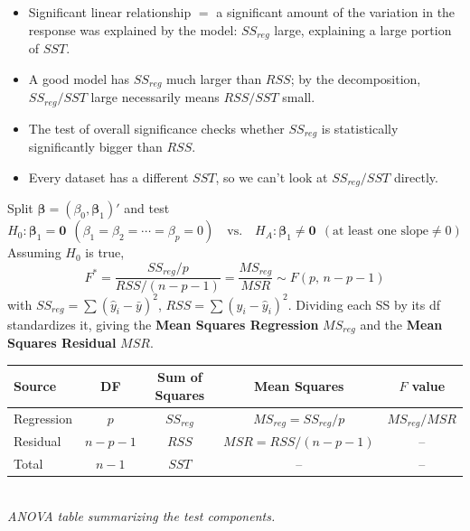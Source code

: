\begin{remark}
    \begin{itemize}
        \item Significant linear relationship $=$ a significant amount of the variation in the
        response was explained by the model: $SS_{reg}$ large, explaining a large portion of $SST$.
        \item A good model has $SS_{reg}$ much larger than $RSS$; by the decomposition,
        $SS_{reg}/SST$ large necessarily means $RSS/SST$ small.
        \item The test of overall significance checks whether $SS_{reg}$ is statistically
        significantly bigger than $RSS$.
        \item Every dataset has a different $SST$, so we can't look at $SS_{reg}/SST$ directly.
    \end{itemize}
\end{remark}

\begin{definition}
    Split $\boldsymbol\beta=(\beta_0,\boldsymbol\beta_1)'$ and test
    \[H_0:\boldsymbol\beta_1=\mathbf{0}\ \ (\beta_1=\beta_2=\cdots=\beta_p=0)\quad\text{vs.}\quad H_A:\boldsymbol\beta_1\neq\mathbf{0}\ \ (\text{at least one slope}\neq0)\]
    Assuming $H_0$ is true,
    \[\boxed{F^*=\frac{SS_{reg}/p}{RSS/(n-p-1)}=\frac{MS_{reg}}{MSR}\sim F(p,\,n-p-1)}\]
    with $SS_{reg}=\sum(\hat y_i-\bar y)^2$, $RSS=\sum(y_i-\hat y_i)^2$.
     Dividing each SS by its df
    standardizes it, giving the \textbf{Mean Squares Regression} $MS_{reg}$ and the
    \textbf{Mean Squares Residual} $MSR$.
\end{definition}

\begin{center}
    \begin{tabular}{lcccc}
        \toprule
        Source & DF & Sum of Squares & Mean Squares & $F$ value \\
        \midrule
        Regression & $p$ & $SS_{reg}$ & $MS_{reg}=SS_{reg}/p$ & $MS_{reg}/MSR$ \\
        Residual & $n-p-1$ & $RSS$ & $MSR=RSS/(n-p-1)$ & -- \\
        Total & $n-1$ & $SST$ & -- & -- \\
        \bottomrule
    \end{tabular}
    \\[2pt] \textit{\small ANOVA table summarizing the test components.}
\end{center}

